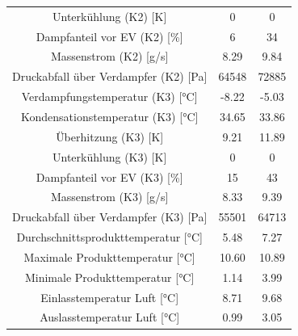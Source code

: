\begin{table}[h!]
\begin{tabular}{|ccc|}
\multicolumn{1}{|c|}{Unterkühlung (K2) {[}K{]}}                 & \multicolumn{1}{c|}{0}     & 0                      \\
\multicolumn{1}{|c|}{Dampfanteil vor EV (K2) {[}\%{]}}          & \multicolumn{1}{c|}{6}     & 34                     \\
\multicolumn{1}{|c|}{Massenstrom (K2) {[}g/s{]}}                & \multicolumn{1}{c|}{8.29}  & 9.84                   \\
\multicolumn{1}{|c|}{Druckabfall über Verdampfer (K2) {[}Pa{]}} & \multicolumn{1}{c|}{64548} & 72885                  \\ \hline
\multicolumn{1}{|c|}{Verdampfungstemperatur (K3) {[}°C{]}}      & \multicolumn{1}{c|}{-8.22} & -5.03                  \\
\multicolumn{1}{|c|}{Kondensationstemperatur (K3) {[}°C{]}}    & \multicolumn{1}{c|}{34.65} & 33.86                  \\
\multicolumn{1}{|c|}{Überhitzung (K3) {[}K{]}}                  & \multicolumn{1}{c|}{9.21}  & 11.89                  \\
\multicolumn{1}{|c|}{Unterkühlung (K3) {[}K{]}}                 & \multicolumn{1}{c|}{0}     & 0                      \\
\multicolumn{1}{|c|}{Dampfanteil vor EV (K3) {[}\%{]}}          & \multicolumn{1}{c|}{15}    & 43                     \\
\multicolumn{1}{|c|}{Massenstrom (K3) {[}g/s{]}}                & \multicolumn{1}{c|}{8.33}  & 9.39                   \\
\multicolumn{1}{|c|}{Druckabfall über Verdampfer (K3) {[}Pa{]}} & \multicolumn{1}{c|}{55501} & 64713                  \\ \hline
\multicolumn{1}{|c|}{Durchschnittsprodukttemperatur {[}°C{]}}   & \multicolumn{1}{c|}{5.48}  & 7.27                   \\
\multicolumn{1}{|c|}{Maximale Produkttemperatur {[}°C{]}}       & \multicolumn{1}{c|}{10.60} & 10.89                  \\
\multicolumn{1}{|c|}{Minimale Produkttemperatur {[}°C{]}}       & \multicolumn{1}{c|}{1.14}  & 3.99                   \\
\multicolumn{1}{|c|}{Einlasstemperatur Luft {[}°C{]}}           & \multicolumn{1}{c|}{8.71}  & 9.68                   \\
\multicolumn{1}{|c|}{Auslasstemperatur Luft {[}°C{]}}           & \multicolumn{1}{c|}{0.99}  & 3.05                   \\ \hline
\end{tabular}
\end{table}



